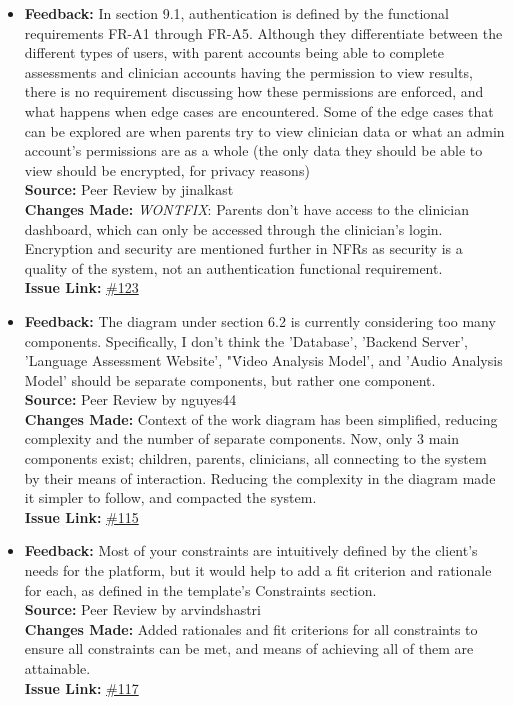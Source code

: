 \documentclass{article}
\begin{document}
\begin{itemize}
  \item 
    \textbf{Feedback:} In section 9.1, authentication is defined by the functional requirements FR-A1 through FR-A5. Although they differentiate between the different types of users, with parent accounts being able to complete assessments and clinician accounts having the permission to view results, there is no requirement discussing how these permissions are enforced, and what happens when edge cases are encountered. Some of the edge cases that can be explored are when parents try to view clinician data or what an admin account's permissions are as a whole (the only data they should be able to view should be encrypted, for privacy reasons) \\
    \textbf{Source:} Peer Review by jinalkast\\
    \textbf{Changes Made:} \textit{WONTFIX}: Parents don't have access to the clinician dashboard, which can only be accessed through the clinician's login.\\
    Encryption and security are mentioned further in NFRs as security is a quality of the system, not an authentication functional requirement.\\
    \textbf{Issue Link:} \href{https://github.com/parishanizam/TeleHealth/issues/123}{\#123}
  
  \item 
    \textbf{Feedback:} The diagram under section 6.2 is currently considering too many components. Specifically, I don't think the 'Database', 'Backend Server', 'Language Assessment Website', "\'Video Analysis Model', and 'Audio Analysis Model' should be separate components, but rather one component. \\
    \textbf{Source:} Peer Review by nguyes44\\
    \textbf{Changes Made:} Context of the work diagram has been simplified, reducing complexity and the number of separate components. Now, only 3 main components exist; children, parents, clinicians, all connecting to the system by their means of interaction. Reducing the complexity in the diagram made it simpler to follow, and compacted the system.\\
    \textbf{Issue Link:} \href{https://github.com/parishanizam/TeleHealth/issues/115}{\#115}
  
  \item 
    \textbf{Feedback:} Most of your constraints are intuitively defined by the client's needs for the platform, but it would help to add a fit criterion and rationale for each, as defined in the template's Constraints section. \\
    \textbf{Source:} Peer Review by arvindshastri\\
    \textbf{Changes Made:} Added rationales and fit criterions for all constraints to ensure all constraints can be met, and means of achieving all of them are attainable.\\
    \textbf{Issue Link:} \href{https://github.com/parishanizam/TeleHealth/issues/117}{\#117}
  

\end{itemize}
\end{document}
